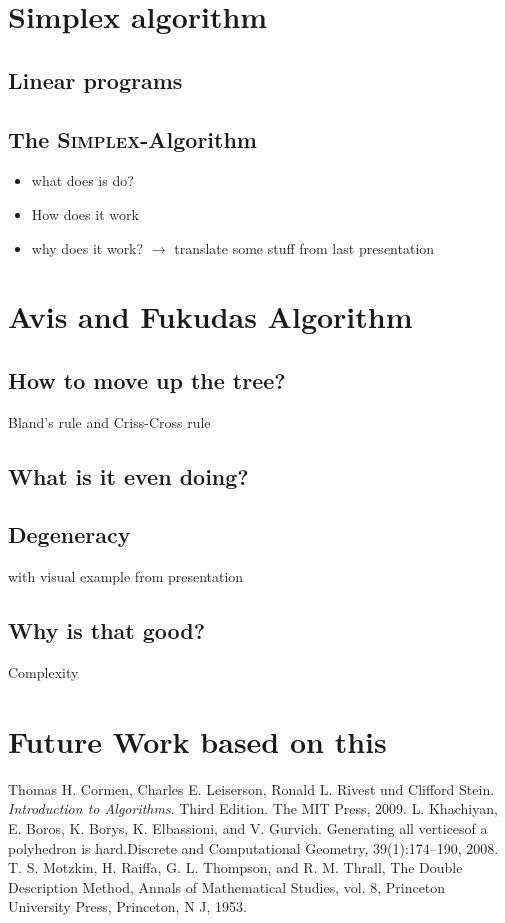 \documentclass[a4paper, 11pt]{article}
\begin{document}
\section{Simplex algorithm}
\subsection{Linear programs}
\subsection{The \textsc{Simplex}-Algorithm}
\begin{itemize}
	\item what does is do?
	\item How does it work
	\item why does it work? $\rightarrow$ translate some stuff from last presentation
\end{itemize}

\section{Avis and Fukudas Algorithm}
\subsection{How to move up the tree?}
Bland's rule and Criss-Cross rule
\subsection{What is it even doing?}
\subsection{Degeneracy}
with visual example from presentation
\subsection{Why is that good?}
Complexity

\section{Future Work based on this }

\newpage

\begin{thebibliography}{9}
	Thomas H. Cormen, Charles E. Leiserson, Ronald L. Rivest und Clifford Stein.
	\textit{Introduction to Algorithms}. Third Edition. The MIT Press, 2009.
	L. Khachiyan, E. Boros, K. Borys, K. Elbassioni, and V. Gurvich. Generating all
	verticesof a polyhedron is hard.Discrete and Computational Geometry,
	39(1):174–190, 2008.
	T. S. Motzkin, H. Raiffa, G. L. Thompson, and R. M. Thrall, The Double Description Method,
	Annals of Mathematical Studies, vol. 8, Princeton University Press, Princeton, N J, 1953.
\end{thebibliography}
\end{document}
